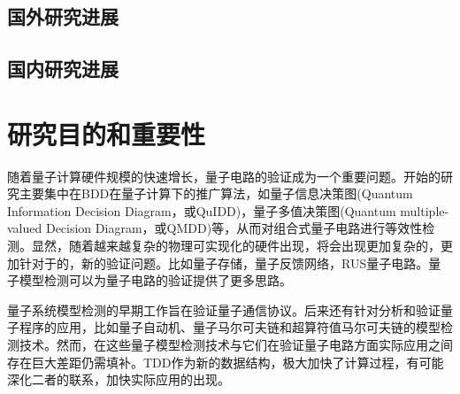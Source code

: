 \subsection{国外研究进展}
\subsection{国内研究进展}



\section{研究目的和重要性}
随着量子计算硬件规模的快速增长，量子电路的验证成为一个重要问题。开始的研究主要集中在BDD在量子计算下的推广算法，如量子信息决策图(Quantum Information Decision Diagram，或QuIDD)\citep{Viamontes_2003}，量子多值决策图(Quantum multiple-valued Decision Diagram，或QMDD)\citep{Seiter_2013}等，从而对组合式量子电路进行等效性检测。显然，随着越来越复杂的物理可实现化的硬件出现，将会出现更加复杂的，更加针对于的，新的验证问题。比如量子存储\citep{Kerckhoff_2010}，量子反馈网络\citep{Gough_2008}，RUS量子电路\citep{Bocharov_2015}。量子模型检测可以为量子电路的验证提供了更多思路。

量子系统模型检测的早期工作旨在验证量子通信协议\citep{Gay,BALTAZAR_2008,davidson2012model}。后来还有针对分析和验证量子程序的应用\citep{ying2016foundations}，比如量子自动机\citep{ying2014model}、量子马尔可夫链\citep{Ying_2013}和超算符值马尔可夫链\citep{feng2013model}的模型检测技术。然而，在这些量子模型检测技术与它们在验证量子电路方面实际应用之间存在巨大差距仍需填补。TDD作为新的数据结构，极大加快了计算过程，有可能深化二者的联系，加快实际应用的出现。

